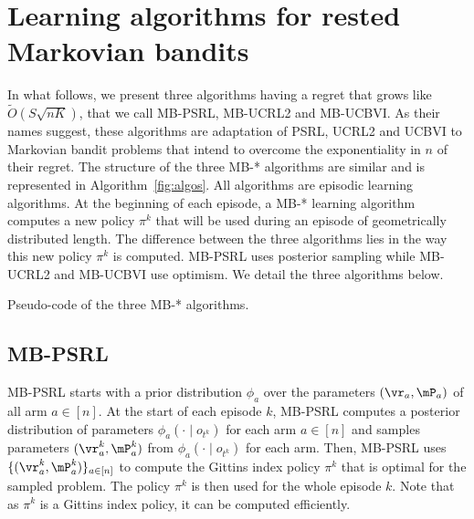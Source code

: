 \section{Learning algorithms for rested Markovian bandits}
\label{sec:learning_algorithms}

In what follows, we present three algorithms having a regret that grows like $\tilde{O}(S\sqrt{nK})$, that we call MB-PSRL, MB-UCRL2 and MB-UCBVI. As their names suggest, these algorithms are adaptation of PSRL, UCRL2 and UCBVI to Markovian bandit problems that intend to overcome the exponentiality in $n$ of their regret. The structure of the three MB-* algorithms are similar and is represented in Algorithm~\ref{fig:algos}. All algorithms are episodic learning algorithms. At the beginning of each episode, a MB-* learning algorithm computes a new policy $\pi^k$ that will be used during an episode of geometrically distributed length. The difference between the three algorithms lies in the way this new policy $\pi^k$ is computed. MB-PSRL uses posterior sampling while MB-UCRL2 and MB-UCBVI use optimism. We detail the three algorithms below. 

\begin{algorithm}[ht]
    \BlankLine
    \caption{Pseudo-code of the three MB-* algorithms.}
    \label{fig:algos}
\end{algorithm}

\subsection{MB-PSRL}
MB-PSRL starts with a prior distribution \(\phi_{a}\) over the parameters \((\vr_a,\mP_a)\) of all arm $a\in[n]$. At the start of each episode $k$, MB-PSRL computes
a posterior distribution of parameters \(\phi_a(\cdot \mid o_{t^k})\) for
each arm $a\in[n]$ and samples parameters \((\vr^k_a,\mP^k_a)\) from
\(\phi_a(\cdot \mid o_{t^k})\) for each arm. Then, MB-PSRL uses \(\{(\vr^k_a,\mP^k_a)\}_{a\in[n]}\)
to compute the Gittins index policy $\pi^k$ that is optimal for the sampled
problem.  The policy \(\pi^k\)  is then used for the whole episode \(k\). Note that as $\pi^k$ is a Gittins index policy, it can be computed efficiently. 

